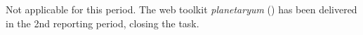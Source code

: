 \subparagraph{} Not
applicable for this period.  The web toolkit \textit{planetaryum}
() has been delivered in the 2nd reporting
period, closing the task.

  

